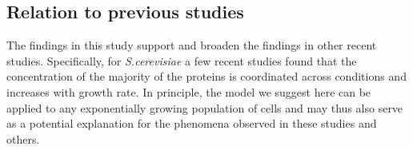 \subsection{Relation to previous studies}
The findings in this study support and broaden the findings in other recent studies.
Specifically, for \emph{S.cerevisiae} a few recent studies found that the concentration of the majority of the proteins is coordinated across conditions \cite{Keren2013a,Gasch2000,Brauer2008a} and increases with growth rate.
In principle, the model we suggest here can be applied to any exponentially growing population of cells and may thus also serve as a potential explanation for the phenomena observed in these studies and others.